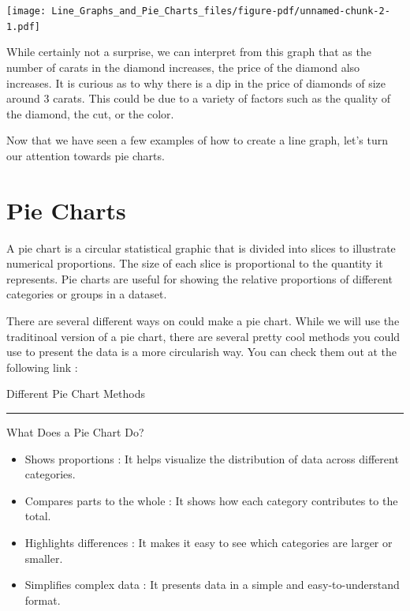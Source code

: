 \documentclass[
  letterpaper,
  DIV=11,
  numbers=noendperiod]{scrreprt}
\providecommand{\tightlist}{%
  \setlength{\itemsep}{0pt}\setlength{\parskip}{0pt}}\usepackage{longtable,booktabs,array}
\begin{document}
\texttt{[image: Line\_Graphs\_and\_Pie\_Charts\_files/figure-pdf/unnamed-chunk-2-1.pdf]}

While certainly not a surprise, we can interpret from this graph that as
the number of carats in the diamond increases, the price of the diamond
also increases. It is curious as to why there is a dip in the price of
diamonds of size around 3 carats. This could be due to a variety of
factors such as the quality of the diamond, the cut, or the color.

Now that we have seen a few examples of how to create a line graph,
let's turn our attention towards pie charts.

\section*{Pie Charts}\label{pie-charts}


A pie chart is a circular statistical graphic that is divided into
slices to illustrate numerical proportions. The size of each slice is
proportional to the quantity it represents. Pie charts are useful for
showing the relative proportions of different categories or groups in a
dataset.

There are several different ways on could make a pie chart. While we
will use the traditinoal version of a pie chart, there are several
pretty cool methods you could use to present the data is a more
circularish way. You can check them out at the following link :

Different Pie Chart Methods

\begin{center}\rule{0.5\linewidth}{0.5pt}\end{center}

What Does a Pie Chart Do?

\begin{itemize}
\tightlist
\item
  Shows proportions : It helps visualize the distribution of data across
  different categories.
\item
  Compares parts to the whole : It shows how each category contributes
  to the total.
\item
  Highlights differences : It makes it easy to see which categories are
  larger or smaller.
\item
  Simplifies complex data : It presents data in a simple and
  easy-to-understand format.
\end{itemize}
\end{document}
